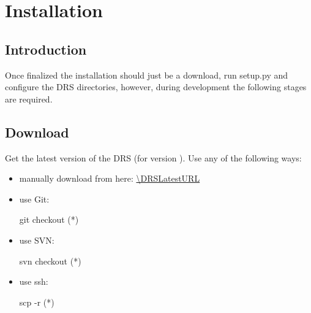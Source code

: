 \chapter{Installation}
\label{chapter:installation}


\section{Introduction}
\label{ch:install:installintro}

Once finalized the installation should just be a download, run setup.py and configure the DRS directories, however, during development the following stages are required.








\section{Download}
\label{ch:install:installDownload}

Get the latest version of the DRS (for \instrument version \MyCodeVersion). Use any of the following ways:

\begin{itemize}
\item manually download from here: \url{\DRSLatestURL}

\item use Git:
\begin{cmdbox}
git checkout (*\DRSGitURL*)
\end{cmdbox}

\item use SVN:
\begin{cmdbox}
svn checkout  (*\DRSGitURL*)
\end{cmdbox}

\item use ssh:
\begin{cmdbox}
scp -r (*\DRSsshURL*)
\end{cmdbox}

\end{itemize}


